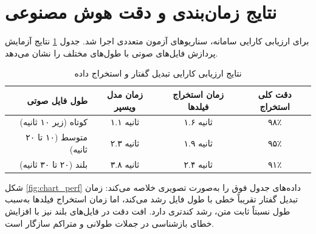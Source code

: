 \documentclass[11pt, a4paper]{report}
\begin{document}
\section{نتایج زمان‌بندی و دقت هوش مصنوعی}
برای ارزیابی کارایی سامانه، سناریوهای آزمون متعددی اجرا شد. جدول \ref{tab:perf_ai} نتایج آزمایش پردازش فایل‌های صوتی با طول‌های مختلف را نشان می‌دهد.

\begin{table}[htbp]
\centering
\caption{نتایج ارزیابی کارایی تبدیل گفتار و استخراج داده}
\label{tab:perf_ai}
\renewcommand{\arraystretch}{1.5}
\begin{tabular}{|r|c|c|c|}
\hline
\textbf{طول فایل صوتی} & \textbf{زمان مدل ویسپر} & \textbf{زمان استخراج فیلدها} & \textbf{دقت کلی استخراج} \\ \hline
کوتاه (زیر ۱۰ ثانیه) & ۱.۱ ثانیه & ۱.۶ ثانیه & ۹۸٪ \\ \hline
متوسط (۱۰ تا ۲۰ ثانیه) & ۲.۳ ثانیه & ۱.۹ ثانیه & ۹۵٪ \\ \hline
بلند (۲۰ تا ۳۰ ثانیه) & ۳.۸ ثانیه & ۲.۴ ثانیه & ۹۱٪ \\ \hline
\end{tabular}
\end{table}

شکل \ref{fig:chart_perf} داده‌های جدول فوق را به‌صورت تصویری خلاصه می‌کند: زمان تبدیل گفتار تقریباً خطی با طول فایل رشد می‌کند، اما زمان استخراج فیلدها به‌سبب طول نسبتاً ثابت متن، رشد کندتری دارد. افت دقت در فایل‌های بلند نیز با افزایش خطای بازشناسی در جملات طولانی و متراکم سازگار است.
\end{document}
